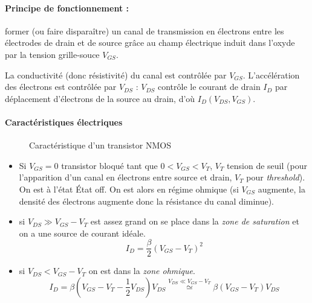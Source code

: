 \documentclass[main.tex]{subfiles}
\begin{document}
\paragraph{Principe de fonctionnement :}

former (ou faire disparaître) un canal de transmission en électrons entre les électrodes de drain et de source grâce au champ électrique induit dans l'oxyde par la tension grille-souce $V_{GS}$.

La conductivité (donc résistivité) du canal est contrôlée par $V_{GS}$. L'accélération des électrons est contrôlée par $V_{DS}$ : $V_{DS}$ contrôle le courant de drain $I_D$ par déplacement d'électrons de la source au drain, d'où $I_D(V_{DS},V_{GS})$.\\

\paragraph{Caractéristiques électriques}

\begin{figure}[H]
  \centering
  \caption{Caractéristique d'un transistor NMOS}
\end{figure}
\begin{itemize}
\item Si $V_{GS}=0$ transistor bloqué tant que $0<V_{GS}<V_T$, $V_T$ tension de seuil (pour l'apparition d'un canal en électrons entre source et drain, $V_T$  pour \emph{threshold}). On est à l'état État off.
  On est alors en régime ohmique (si $V_{GS}$ augmente, la densité des électrons augmente donc la résistance du canal diminue).\\
\item si $V_{DS}\gg V_{GS}-V_T$ est assez grand on se place dans la \emph{zone de saturation}  et on a une source de courant idéale.
\[
  I_{D} = \frac{\beta}{2}\left( V_{GS}-V_T\right)^2
\]

\item si $V_{DS}< V_{GS}-V_{T}$ on est dans la \emph{zone ohmique}.
\[
  I_{D} = \beta \left( V_{GS}-V_T-\frac{1}{2}V_{DS}\right)V_{DS}
  \overset{V_{DS}\ll V_{GS}-V_{T} }{\simeq}
   \beta (V_{GS}-V_T)V_{DS}
\]

\end{itemize}
\end{document}
